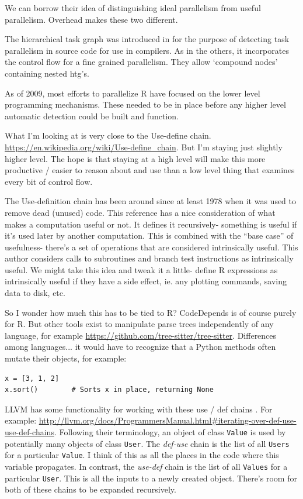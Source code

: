 \documentclass[12pt]{article}
\begin{document}
We can borrow their idea of distinguishing ideal parallelism from useful
parallelism. Overhead makes these two different.

The hierarchical task graph was introduced in \cite{girkar1992automatic}
for the purpose of detecting task parallelism in source code for use in compilers.
As in the others, it incorporates the control flow for a fine grained
parallelism. They allow `compound nodes' containing nested htg's.

As of 2009, most efforts to parallelize R have focused on the lower level
programming mechanisms. These needed to be in place before any higher level
automatic detection could be built and function.
\cite{schmidberger2009state} 

What I'm looking at is very close to the Use-define chain.
\url{https://en.wikipedia.org/wiki/Use-define_chain}. But I'm staying just
slightly higher level. The hope is that staying at a high level will make
this more productive / easier to reason about and use than a low level
thing that examines every bit of control flow.

The Use-definition chain has been around since at least 1978
when it was used to remove dead (unused) code\cite{kennedy1978use}. This
reference has a nice consideration of what makes a computation useful or
not. It defines it recursively- something is useful if it's used later by another
computation. This is combined with the ``base case'' of usefulness- there's
a set of operations that are considered intrinsically useful. This author
considers calls to subroutines and branch test instructions as
intrinsically useful. We might take this idea and tweak it a little- define
R expressions as intrinsically useful if they have a side effect, ie. any
plotting commands, saving data to disk, etc.

So I wonder how much this has to be tied to R? CodeDepends is of course
purely for R. But other tools exist to manipulate parse trees independently
of any language, for example
\url{https://github.com/tree-sitter/tree-sitter}. Differences among
languages... it would have to recognize that a Python methods often mutate
their objects, for example:

\begin{verbatim}
x = [3, 1, 2]
x.sort()        # Sorts x in place, returning None
\end{verbatim}

LLVM has some functionality for working with these use / def chains
\cite{Lattner2004}. For example:
\url{http://llvm.org/docs/ProgrammersManual.html#iterating-over-def-use-use-def-chains}.
Following their terminology, an object of class \texttt{Value} is used by
potentially many objects of class \texttt{User}. The \emph{def-use} chain
is the list of all \texttt{Users} for a particular \texttt{Value}. I think
of this as all the places in the code where this variable propagates. In
contrast, the \emph{use-def} chain is the list of all \texttt{Values} for a
particular \texttt{User}. This is all the inputs to a newly
created object. There's room for both of these chains to be expanded recursively.
\end{document}
